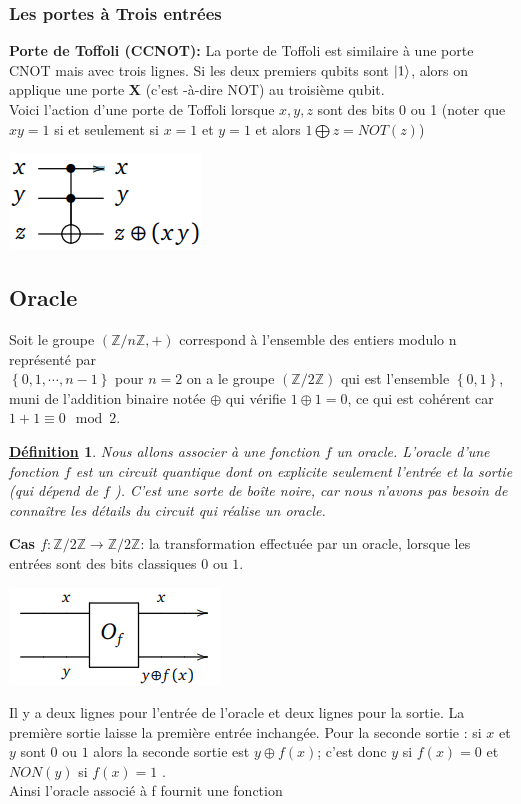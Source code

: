 \documentclass[12pt,openany]{report}
\newtheorem{definition}{\underline{Définition}}
\DeclarePairedDelimiter\ket{\lvert}{\rangle}
\begin{document}
\subsubsection{Les portes à Trois entrées}
\textbf{Porte de Toffoli (CCNOT):} La porte de Toffoli est similaire à une porte CNOT mais avec trois lignes. Si les deux premiers qubits sont $\ket{1}$, alors on applique une porte \textbf{X} (c'est -à-dire NOT) au troisième qubit.\\ Voici l'action d'une porte de Toffoli lorsque $x,y,z  $  sont des bits 0 ou 1 (noter que $xy=1  $ si et seulement si $x=1 $ et $ y=1 $ et alors $ 1\bigoplus z = NOT(z) $)
\begin{center}
\includegraphics[scale=1]{./toffoli}
\end{center}
\subsection{Oracle}

Soit le groupe $ (\mathbb{Z}/n \mathbb{Z},+) $ correspond à l'ensemble des entiers modulo n représenté par \\ $\left\lbrace  0,1,\cdots,n-1 \right\rbrace $ pour $n=2  $ on a le groupe $ (\mathbb{Z}/2 \mathbb{Z}) $ qui est l'ensemble $\left\lbrace 0,1 \right\rbrace   $, muni de l'addition binaire notée  $ \oplus $ qui vérifie
$ 1 \oplus 1 =0   $, ce qui est cohérent car $1+1 \equiv 0 \mod 2  $.

\begin{definition}
Nous allons associer à une fonction $f$ un oracle. L’oracle d’une fonction $f$ est un circuit quantique dont on
explicite seulement l’entrée et la sortie (qui dépend de $f$ ). C’est une sorte de boîte noire, car nous n’avons
pas besoin de connaître les détails du circuit qui réalise un oracle.
\end{definition}
\textbf{Cas $ f: \mathbb{Z}/2\mathbb{Z} \rightarrow \mathbb{Z}/2\mathbb{Z} $}: la transformation effectuée par un oracle, lorsque les entrées sont des bits classiques $0 $ ou $1 $.\\
\begin{center}
\includegraphics[scale=1]{./oracle1}
\end{center}
Il y a deux lignes pour l’entrée de l’oracle et deux lignes pour la sortie. La première sortie laisse la première
entrée inchangée. Pour la seconde sortie : si $x$ et $y$ sont $0$ ou $1$ alors la seconde sortie est $y \oplus  f (x)$; c’est
donc $y$ si $f (x) = 0$ et $ NON( y)$  si  $ f (x) = 1$ .\\
Ainsi l’oracle associé à f fournit une fonction
\end{document}
